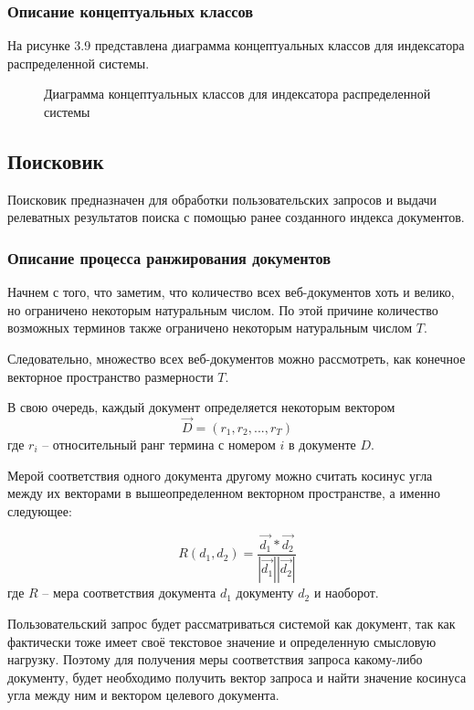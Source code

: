 \subsubsection{Описание концептуальных классов}

На рисунке 3.9 представлена диаграмма концептуальных классов для индексатора распределенной системы.
\begin{figure}[H]
\caption{Диаграмма концептуальных классов для индексатора распределенной системы}
\label{indexer/diagram_classes:image}
\end{figure}

\subsection{Поисковик}

Поисковик предназначен для обработки пользовательских запросов и выдачи релеватных результатов поиска с помощью ранее созданного индекса документов.

\subsubsection{Описание процесса ранжирования документов}

Начнем с того, что заметим, что количество всех веб-документов хоть и велико, но ограничено некоторым натуральным числом. По этой причине количество возможных терминов также ограничено некоторым натуральным числом $T$. 

Следовательно, множество всех веб-документов можно рассмотреть, как конечное векторное пространство размерности $T$. 

В свою очередь, каждый документ определяется некоторым вектором
\begin{equation}
\vec{D}=(r_1, r_2, ..., r_T)
\end{equation} где $r_i$ -- относительный ранг термина с номером $i$ в документе $D$.

Мерой соответствия одного документа другому можно считать косинус угла между их векторами в вышеопределенном векторном пространстве, а именно следующее:

\begin{equation}
R(d_1, d_2)=\frac{\vec{d_1} * \vec{d_2}}{|\vec{d_1}| |\vec{d_2}|}
\end{equation} где $R$ -- мера соответствия документа $d_1$ документу $d_2$ и наоборот.

Пользовательский запрос будет рассматриваться системой как документ, так как фактически тоже имеет своё текстовое значение и определенную смысловую нагрузку. Поэтому для получения меры соответствия запроса какому-либо документу, будет необходимо получить вектор запроса и найти значение косинуса угла между ним и вектором целевого документа.

